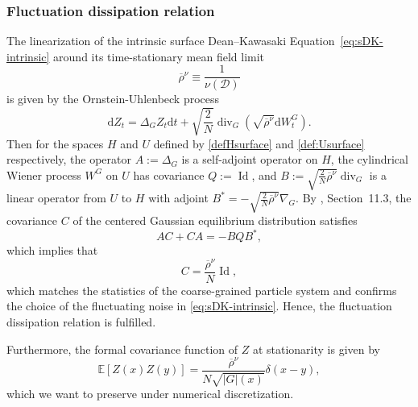 \documentclass[11pt, a4paper]{article}
\newcommand{\mathd}{\mathrm{d}}
\newcommand{\JBB}[1]{{\color{teal}JBB: #1}}
\begin{document}
\subsubsection{
Fluctuation dissipation  relation}

The  linearization of the intrinsic surface Dean--Kawasaki Equation~\eqref{eq:sDK-intrinsic} around its time-stationary mean field limit
\[
    \overline{\rho}^\nu \equiv \frac{1}{\nu(\mathcal{D})}
\]
is given by the Ornstein-Uhlenbeck process
\begin{equation}\label{eq:lin}
       \mathd Z_t = \Delta_G Z_t \mathd t +
   \sqrt{\frac{2}{N}} \operatorname{div}_G \left( \sqrt{\overline{\rho}^\nu} \mathd W^G_t \right).
\end{equation}
Then for the spaces $H$ and $U$ defined by \eqref{defHsurface} and \eqref{def:Usurface} respectively, the operator $A:=\Delta_G$ is a self-adjoint operator on $H$, the cylindrical Wiener process $W^G$ on $U$ has covariance $Q:=\operatorname{Id}$, and $B:=\sqrt{\frac{2}{N}\overline{\rho}^\nu}\operatorname{div}_G$ is a linear operator from $U$ to $H$ with adjoint $B^*=-\sqrt{\frac{2}{N}\overline{\rho}^\nu}\nabla_G$. %
By \cite{DaPrato2014}, Section~11.3, the covariance $C$ of the centered Gaussian equilibrium distribution satisfies 
\begin{equation*}
    AC+CA=-BQB^*,
\end{equation*}
which implies that
\[
C = \frac{\overline{\rho}^\nu}{N}\operatorname{Id} ,
\]
which matches the statistics of the coarse-grained particle system and confirms the choice of the fluctuating noise in \eqref{eq:sDK-intrinsic}.
Hence, the fluctuation dissipation relation is fulfilled. 

Furthermore, the formal covariance function of $Z$ at stationarity is given by
\begin{equation}\label{cFDR}
    \mathbb{E}[Z(x)Z(y)]=\frac{\overline{\rho}^\nu}{N\sqrt{|G|(x)}}\delta(x-y),
\end{equation}
which we want to preserve under numerical discretization.
\end{document}
